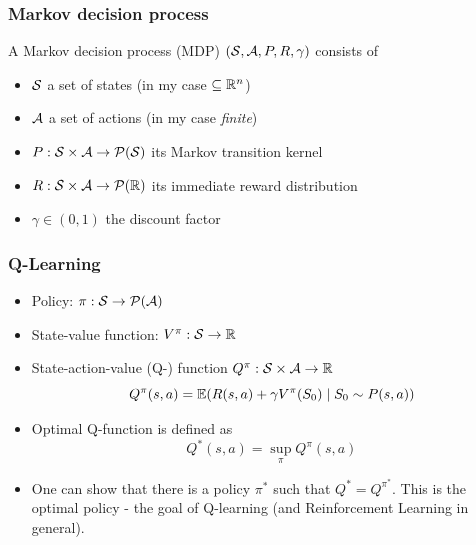 \documentclass{beamer}
\begin{document}
\begin{frame}
	\frametitle{Markov decision process}
	\begin{Defi}
		A Markov decision process (MDP) $(\mathcal{S}, \mathcal{A}, P, R, \gamma)$
		consists of
		\begin{itemize}
			\item $\mathcal{S}$ a set of states (in my case $\subseteq \mathbb{R}^n$)
			\item $\mathcal{A}$ a set of actions (in my case \emph{finite})
			\item $P : \mathcal{S} \times \mathcal{A} \to \mathcal{P}(\mathcal{S})$
				its Markov transition kernel
			\item $R : \mathcal{S} \times \mathcal{A} \to \mathcal{P}(\mathbb{R})$
				its immediate reward distribution
			\item $\gamma \in (0,1)$ the discount factor
		\end{itemize}
	\end{Defi}

\end{frame}

\begin{frame}
	\frametitle{Q-Learning}
	\begin{itemize}
		\item Policy: $\pi : \mathcal{S} \to \mathcal{P}(\mathcal{A})$
		\item State-value function: $V^\pi : \mathcal{S} \to \mathbb{R}$
		\item State-action-value (Q-) function $Q^\pi : \mathcal{S} \times \mathcal{A} \to \mathbb{R}$
			\[ Q^\pi(s, a) = \mathbb{E} (R(s, a) + \gamma V^\pi(S_0) \mid S_0 \sim P(s, a)) \]
		\item Optimal Q-function is defined as
			\[ Q^*(s, a) = \sup_\pi Q^\pi(s, a) \]
		\item One can show that there is a policy $\pi^*$ such that $Q^* = Q^{\pi^*}$.
			This is the optimal policy - the goal of Q-learning
			(and Reinforcement Learning in general). 
	\end{itemize}
\end{frame}
\end{document}
